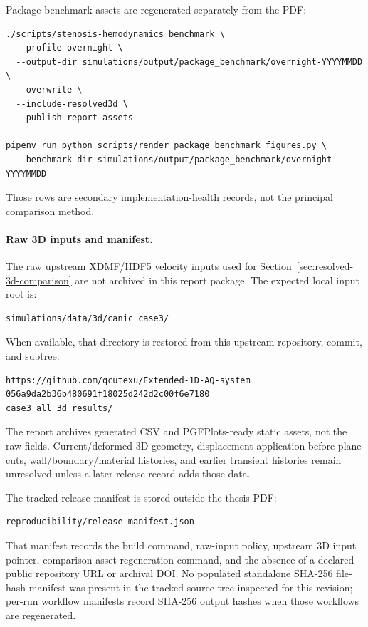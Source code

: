 Package-benchmark assets are regenerated separately from the PDF:
\begin{lstlisting}[basicstyle=\ttfamily\footnotesize,breaklines=true]
./scripts/stenosis-hemodynamics benchmark \
  --profile overnight \
  --output-dir simulations/output/package_benchmark/overnight-YYYYMMDD \
  --overwrite \
  --include-resolved3d \
  --publish-report-assets

pipenv run python scripts/render_package_benchmark_figures.py \
  --benchmark-dir simulations/output/package_benchmark/overnight-YYYYMMDD
\end{lstlisting}
Those rows are secondary implementation-health records, not the principal
comparison method.

\paragraph*{Raw 3D inputs and manifest.}
The raw upstream XDMF/HDF5 velocity inputs used for
Section~\ref{sec:resolved-3d-comparison} are not archived in this report
package. The expected local input root is:
\begin{lstlisting}[basicstyle=\ttfamily\footnotesize,breaklines=true]
simulations/data/3d/canic_case3/
\end{lstlisting}
When available, that directory is restored from this upstream repository,
commit, and subtree:
\begin{lstlisting}[basicstyle=\ttfamily\footnotesize,breaklines=true]
https://github.com/qcutexu/Extended-1D-AQ-system
056a9da2b36b480691f18025d242d2c00f6e7180
case3_all_3d_results/
\end{lstlisting}
The report archives generated CSV and PGFPlots-ready static assets, not the raw
fields. Current/deformed 3D geometry, displacement application before plane
cuts, wall/boundary/material histories, and earlier transient histories remain
unresolved unless a later release record adds those data.

The tracked release manifest is stored outside the thesis PDF:
\begin{lstlisting}[basicstyle=\ttfamily\footnotesize,breaklines=true]
reproducibility/release-manifest.json
\end{lstlisting}
That manifest records the build command, raw-input policy, upstream 3D input
pointer, comparison-asset regeneration command, and the absence of a declared
public repository URL or archival DOI. No populated standalone SHA-256
file-hash manifest was present in the tracked source tree inspected for this
revision; per-run workflow manifests record SHA-256 output hashes when those
workflows are regenerated.
